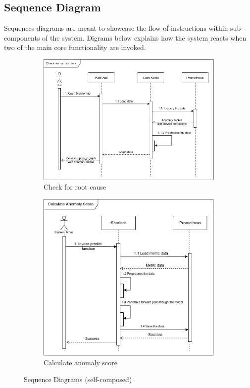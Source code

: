 \subsection{Sequence Diagram}

Sequences diagrams are meant to showcase the flow of instructions within sub-components of the system. Digrams below explains how the system reacts when two of the main core functionality are invoked.

\begin{figure}[H]
    \centering
    \begin{subfigure}[b]{0.8\textwidth}
        \centering
        \includegraphics[width=\textwidth]{assets/system-design/sequence-diagram-1.png}
        \caption{Check for root cause}
    \end{subfigure}
    \hfill
    \begin{subfigure}[b]{0.8\textwidth}
        \centering
        \includegraphics[width=\textwidth]{assets/system-design/sequence-diagram-2.png}
        \caption{Calculate anomaly score}
    \end{subfigure}
    \hfill
       \caption{Sequence Diagrams (self-composed)}
\end{figure}

